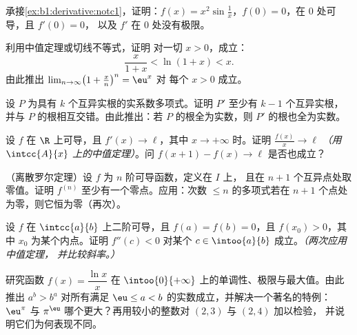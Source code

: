 \begin{exercise}[$\star$]\label{exo:b1:derivative:2}
承接\cref{ex:b1:derivative:notc1}，证明：$f(x) = x^2
\sin\frac1x$，$f(0) = 0$，在 $0$ 处可导，且 $f'(0) = 0$，
以及 $f'$ 在 $0$ 处没有极限。
\end{exercise}

\begin{exercise}[$\star$]\label{exo:b1:derivative:3}
利用中值定理或切线不等式，证明
对一切 $x > 0$，成立：
\[
\frac{x}{1 + x} < \ln(1 + x) < x .
\]
由此推出 $\lim_{n\to\infty} \bigl(1 + \frac xn\bigr)^n = \eu^x$ 对
每个 $x > 0$ 成立。
\end{exercise}

\begin{exercise}[$\star$]\label{exo:b1:derivative:4}
设 $P$ 为具有 $k$ 个互异实根的实系数多项式。证明
$P'$ 至少有 $k - 1$ 个互异实根，并与
$P$ 的根相互交错。由此推出：若 $P$ 的根全为实数，则 $P'$ 的根也全为实数。
\end{exercise}

\begin{exercise}[$\star\star$]\label{exo:b1:derivative:5}
设 $f$ 在 $\R$ 上可导，且 $f' (x)\to \ell$，其中 $x \to
+\infty$ 时。证明 $\frac{f(x)}{x} \to \ell$ \emph{（用
$\intcc{A}{x}$ 上的中值定理）}。问 $f(x+1) - f(x) \to \ell$ 是否也成立？
\end{exercise}

\begin{exercise}[$\star\star$]\label{exo:b1:derivative:6}
（离散罗尔定理）设 $f$ 为 $n$ 阶可导函数，定义在 $I$ 上，
且在 $n + 1$ 个互异点处取零值。证明 $f^{(n)}$
至少有一个零点。应用：次数 $\leq n$ 的多项式若在
$n+1$ 个点处为零，则它恒为零（再次）。
\end{exercise}

\begin{exercise}[$\star\star$]\label{exo:b1:derivative:7}
设 $f$ 在 $\intcc{a}{b}$ 上二阶可导，且 $f(a) = f(b)
= 0$，且 $f(x_0) > 0$，其中 $x_0$ 为某个内点。证明 $f''(c) <
0$ 对某个 $c \in \intoo{a}{b}$ 成立。\emph{（两次应用中值定理，
并比较斜率。）}
\end{exercise}

\begin{exercise}[$\star\star$]\label{exo:b1:derivative:8}
研究函数 $f(x) = \dfrac{\ln x}{x}$ 在
$\intoo{0}{+\infty}$ 上的单调性、极限与最大值。由此推出 $a^b
> b^a$ 对所有满足 $\eu \leq a < b$ 的实数成立，并解决一个著名的特例：
$\eu^\pi$ 与 $\pi^\eu$ 哪个更大？再用较小的整数对
$(2,3)$ 与 $(2,4)$ 加以检验，
并说明它们为何表现不同。
\end{exercise}

